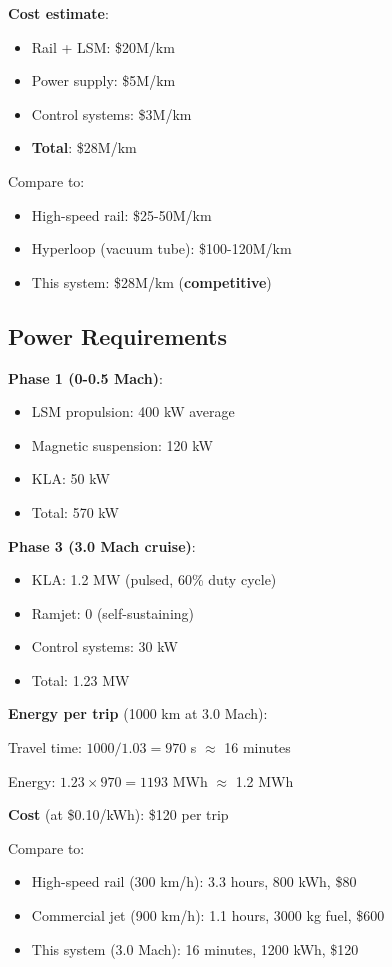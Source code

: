 \documentclass[12pt,a4paper]{article}
\begin{document}
\textbf{Cost estimate}:
\begin{itemize}
\item Rail + LSM: \$20M/km
\item Power supply: \$5M/km
\item Control systems: \$3M/km
\item \textbf{Total}: \$28M/km
\end{itemize}

Compare to:
\begin{itemize}
\item High-speed rail: \$25-50M/km
\item Hyperloop (vacuum tube): \$100-120M/km
\item This system: \$28M/km (\textbf{competitive})
\end{itemize}

\subsection{Power Requirements}

\textbf{Phase 1 (0-0.5 Mach)}:
\begin{itemize}
\item LSM propulsion: 400 kW average
\item Magnetic suspension: 120 kW
\item KLA: 50 kW
\item Total: 570 kW
\end{itemize}

\textbf{Phase 3 (3.0 Mach cruise)}:
\begin{itemize}
\item KLA: 1.2 MW (pulsed, 60\% duty cycle)
\item Ramjet: 0 (self-sustaining)
\item Control systems: 30 kW
\item Total: 1.23 MW
\end{itemize}

\textbf{Energy per trip} (1000 km at 3.0 Mach):

Travel time: $1000 / 1.03 = 970$ s $\approx$ 16 minutes

Energy: $1.23 \times 970 = 1193$ MWh $\approx$ 1.2 MWh

\textbf{Cost} (at \$0.10/kWh): \$120 per trip

Compare to:
\begin{itemize}
\item High-speed rail (300 km/h): 3.3 hours, 800 kWh, \$80
\item Commercial jet (900 km/h): 1.1 hours, 3000 kg fuel, \$600
\item This system (3.0 Mach): 16 minutes, 1200 kWh, \$120
\end{itemize}
\end{document}
